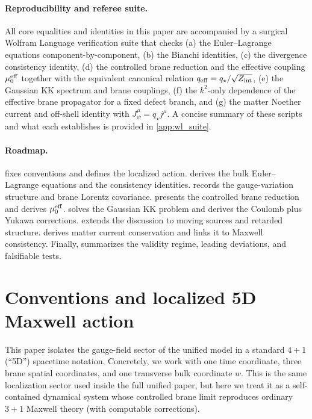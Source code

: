 \documentclass[11pt]{article}
\newcommand{\Zint}{Z_{\rm int}} %
\newcommand{\qstar}{q_\star}
\newcommand{\qeff}{q_{\rm eff}}
\newcommand{\Jpsi}{J_\psi}
\begin{document}
\paragraph{Reproducibility and referee suite.}
All core equalities and identities in this paper are accompanied by a surgical
Wolfram Language verification suite that checks (a) the Euler--Lagrange equations
component-by-component, (b) the Bianchi identities, (c) the divergence
consistency identity, (d) the controlled brane reduction and the effective
coupling \(\mu_0^{\rm eff}\) together with the equivalent canonical relation
\(\qeff=\qstar/\sqrt{\Zint}\), (e) the Gaussian KK spectrum and brane couplings,
(f) the \(k^2\)-only dependence of the effective brane propagator for a fixed
defect branch, and (g) the matter Noether current and off-shell identity with
\(\Jpsi^\mu=\qstar j^\mu\). A concise summary of these scripts and what each
establishes is provided in \cref{app:wl_suite}.

\paragraph{Roadmap.}
 fixes conventions and defines the localized action.
 derives the bulk Euler--Lagrange equations and the
consistency identities.  records the gauge-variation
structure and brane Lorentz covariance.  presents the
controlled brane reduction and derives \(\mu_0^{\rm eff}\).
 solves the Gaussian KK problem and derives the Coulomb plus
Yukawa corrections.  extends the discussion to moving
sources and retarded structure.  derives matter current
conservation and links it to Maxwell consistency. Finally,
 summarizes the validity regime, leading deviations, and
falsifiable tests.

\section{Conventions and localized 5D Maxwell action}
\label{sec:conventions_action}

This paper isolates the gauge-field sector of the unified model in a standard
\(4+1\) (``5D'') spacetime notation. Concretely, we work with one time coordinate,
three brane spatial coordinates, and one transverse bulk coordinate \(w\). This is
the same localization sector used inside the full unified paper, but here we treat
it as a self-contained dynamical system whose controlled brane limit reproduces
ordinary \(3+1\) Maxwell theory (with computable corrections).
\end{document}
